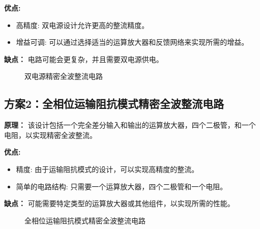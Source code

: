 \documentclass[UTF8,titlepage,a4paper]{ctexart}
\numberwithin{figure}{section}
\begin{document}
\textbf{优点:}
\begin{itemize}
    \item 高精度: 双电源设计允许更高的整流精度。
    \item 增益可调: 可以通过选择适当的运算放大器和反馈网络来实现所需的增益。
\end{itemize}

\textbf{缺点：} 电路可能会更复杂，并且需要双电源供电。

\begin{figure}[H]
\centering
 \caption{双电源精密全波整流电路}
 \label{}
\end{figure}

\subsection{方案2：全相位运输阻抗模式精密全波整流电路}

\textbf{原理：} 该设计包括一个完全差分输入和输出的运算放大器，四个二极管，和一个电阻，以实现精密全波整流。

\textbf{优点:}
\begin{itemize}
    \item 精度: 由于运输阻抗模式的设计，可以实现高精度的整流。
    \item 简单的电路结构: 只需要一个运算放大器，四个二极管和一个电阻。
\end{itemize}

\textbf{缺点：} 可能需要特定类型的运算放大器或其他组件，以实现所需的性能。

\begin{figure}[H]
\centering
 \caption{全相位运输阻抗模式精密全波整流电路}
 \label{}
\end{figure}
\end{document}
